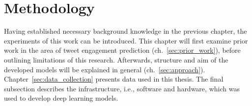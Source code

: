 \section{Methodology}
\label{ch:methodology}

Having established necessary background knowledge in the previous chapter,
the experiments of this work can be introduced.
This chapter will first examine prior work in the area of tweet engagement
prediction (ch.~\ref{sec:prior_work}), before outlining limitations of this
research.
Afterwards, structure and aim of the developed models will be explained in general (ch.~\ref{sec:approach}).
Chapter~\ref{sec:data_collection} presents data used in this thesis.
The final subsection describes the infrastructure, i.e., software and hardware,
which was used to develop deep learning models.








